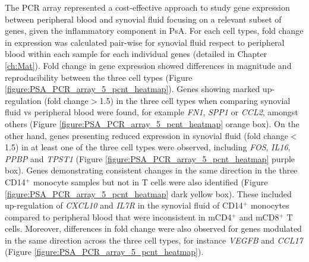 
The PCR array represented a cost-effective approach to study gene expression between peripheral blood and synovial fluid focusing on a relevant subset of genes, given the inflammatory component in PsA. For each cell types, fold change in expression was calculated pair-wise for synovial fluid respect to peripheral blood within each sample for each individual genes (detailed in Chapter \ref{ch:Mat}).  Fold change in gene expression showed differences in magnitude and reproducibility between the three cell types (Figure \ref{figure:PSA_PCR_array_5_pcnt_heatmap}). Genes showing marked up-regulation (fold change$>$1.5) in the three cell types when comparing synovial fluid vs peripheral blood were found, for example \textit{FN1}, \textit{SPP1} or \textit{CCL2}, amongst others (Figure \ref{figure:PSA_PCR_array_5_pcnt_heatmap} orange box). On the other hand, genes presenting reduced expression in synovial fluid (fold change$<$1.5) in at least one of the three cell types were observed, including \textit{FOS}, \textit{IL16}, \textit{PPBP} and \textit{TPST1} (Figure \ref{figure:PSA_PCR_array_5_pcnt_heatmap} purple box). Genes demonstrating consistent changes in the same direction in the three CD14$^+$ monocyte samples but not in T cells were also identified (Figure \ref{figure:PSA_PCR_array_5_pcnt_heatmap} dark yellow box). These included up-regulation of \textit{CXCL10} and \textit{IL7R} in the synovial fluid of CD14$^+$ monocytes compared to peripheral blood that were inconsistent in mCD4$^+$ and mCD8$^+$ T cells. Moreover, differences in fold change were also observed for genes modulated in the same direction across the three cell types, for instance \textit{VEGFB} and \textit{CCL17} (Figure \ref{figure:PSA_PCR_array_5_pcnt_heatmap}).

